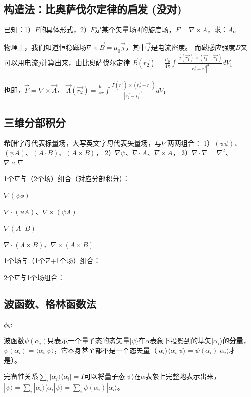 \subsection{构造法：比奥萨伐尔定律的启发 (没对)}
已知：1）$F$的具体形式，2）$F$是某个矢量场$A$的旋度场，$F=\nabla\times A$，求：$A$。

物理上，我们知道恒稳磁场$\nabla\times \vec{B}=\mu_0\vec{j}$，其中$\vec{j}$是电流密度。
而磁感应强度$B$又可以用电流$j$计算出来，由比奥萨伐尔定律
$\vec{B}(\vec{r_{2}}) = \frac{\mu_0}{4\pi} \int \frac{\vec{j}(\vec{r_{1}}) \times (\vec{r_{2}}-\vec{r_{1}})}{|\vec{r_{2}}-\vec{r_{1}}|^3} dV_{1}$

也即，$\vec{F}=\nabla\times \vec{A}$，
$\vec{A}(\vec{r_{2}}) = \frac{\mu_0}{4\pi} \int \frac{\vec{F}(\vec{r_{1}}) \times (\vec{r_{2}}-\vec{r_{1}})}{|\vec{r_{2}}-\vec{r_{1}}|^3} dV_{1}$

\subsection{三维分部积分}
希腊字母代表标量场，大写英文字母代表矢量场，与$\nabla$两两组合：
1）$(\psi\phi)$、$(\psi A)$、$(A\cdot B)$、$(A\times B)$，
2）$\nabla \psi$、$\nabla\cdot A$、$\nabla\times A$，
3）$\nabla\cdot\nabla=\nabla^2$、$\nabla \times \nabla$

1个$\nabla$与（2个场）组合（对应分部积分）：

$\nabla (\psi\phi)$

$\nabla\cdot (\psi A)$、$\nabla\times (\psi A)$

$\nabla (A\cdot B)$

$\nabla \cdot (A\times B)$、$\nabla\times (A\times B)$

1个场与（1个$\nabla$+1个场）组合：

2个$\nabla$与1个场组合：

\subsection{波函数、格林函数法}

$\phi\varphi$

波函数$\psi(\alpha_{i})$只表示一个量子态的态矢量$|\psi\rangle$在$\alpha$表象下投影到的基矢$|\alpha_i\rangle$的\textbf{分量}，
$\psi(\alpha_{i})=\langle\alpha_i|\psi\rangle$，它本身甚至都不是一个态矢量（$|\alpha_i\rangle\langle\alpha_i|\psi\rangle=\psi(\alpha_{i})|\alpha_i\rangle$才是）。

完备性关系$\sum_i |\alpha_i\rangle\langle\alpha_i| = I$可以将量子态$|\psi\rangle$在$\alpha$表象上完整地表示出来，
$|\psi\rangle=\sum_i |\alpha_i\rangle\langle\alpha_i|\psi\rangle=\sum_i \psi(\alpha_i)|\alpha_i\rangle $。

